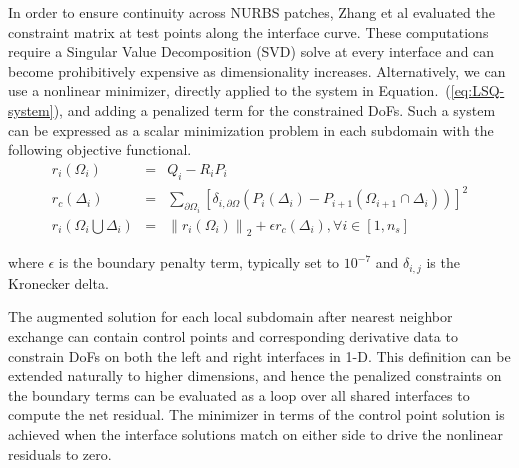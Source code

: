 \documentclass[conference]{IEEEtran}
\newcommand{\eqt}[1]{Equation.~(\ref{#1})}
\begin{document}
In order to ensure continuity across NURBS patches, Zhang et al  \cite{zhang-nurbs-continuity} evaluated the constraint matrix at test points along the interface curve. These computations require a Singular Value Decomposition (SVD) solve at every interface and can become prohibitively expensive as dimensionality increases. Alternatively, we can use a nonlinear minimizer, directly applied to the system in \eqt{eq:LSQ-system}, and adding a penalized term for the constrained DoFs. Such a system can be expressed as a scalar minimization problem in each subdomain with the following objective functional.
%
\begin{eqnarray}
r_i(\Omega_i) &=& Q_i - R_i P_i \nonumber \\
r_c(\Delta_{i})    &=& \sum_{\partial \Omega_i} \left[ \delta_{i,\partial \Omega} (P_i(\Delta_i) - P_{i+1}(\Omega_{i+1} \cap \Delta_{i} ))  \right]^2 \nonumber \\ 
r_i(\Omega_i \bigcup \Delta_{i}) &=& \left\lVert r_i(\Omega_i) \right\rVert_2 + \epsilon r_c(\Delta_{i}), \forall i \in [1, n_s]
\label{eq:nonlinear-residuals}
\end{eqnarray}

where $\epsilon$ is the boundary penalty term, typically set to $10^{-7}$ and $\delta_{i,j}$ is the Kronecker delta.

The augmented solution for each local subdomain after nearest neighbor exchange can contain control points and corresponding derivative data to constrain DoFs on both the left and right interfaces in 1-D. This definition can be extended naturally to higher dimensions, and hence the penalized constraints on the boundary terms can be evaluated as a loop over all shared interfaces to compute the net residual. The minimizer in terms of the control point solution is achieved when the interface solutions match on either side to drive the nonlinear residuals to zero.
\end{document}
